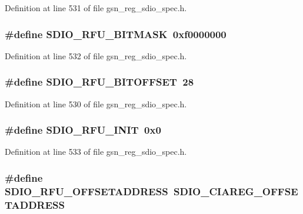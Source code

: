 Definition at line 531 of file gsn\_\-reg\_\-sdio\_\-spec.h.

\hypertarget{a00571_a17c1c637ac34d8ffe8e89a9831f4b377}{
\subsubsection[{SDIO\_\-RFU\_\-BITMASK}]{\setlength{\rightskip}{0pt plus 5cm}\#define SDIO\_\-RFU\_\-BITMASK~0xf0000000}}
\label{a00571_a17c1c637ac34d8ffe8e89a9831f4b377}


Definition at line 532 of file gsn\_\-reg\_\-sdio\_\-spec.h.

\hypertarget{a00571_a8960529b26218fc984c308bf945f24ca}{
\subsubsection[{SDIO\_\-RFU\_\-BITOFFSET}]{\setlength{\rightskip}{0pt plus 5cm}\#define SDIO\_\-RFU\_\-BITOFFSET~28}}
\label{a00571_a8960529b26218fc984c308bf945f24ca}


Definition at line 530 of file gsn\_\-reg\_\-sdio\_\-spec.h.

\hypertarget{a00571_a8f99a3425accb1c048f183b884c95223}{
\subsubsection[{SDIO\_\-RFU\_\-INIT}]{\setlength{\rightskip}{0pt plus 5cm}\#define SDIO\_\-RFU\_\-INIT~0x0}}
\label{a00571_a8f99a3425accb1c048f183b884c95223}


Definition at line 533 of file gsn\_\-reg\_\-sdio\_\-spec.h.

\hypertarget{a00571_ab00e7cb4c2222efa298980139ba77a2e}{
\subsubsection[{SDIO\_\-RFU\_\-OFFSETADDRESS}]{\setlength{\rightskip}{0pt plus 5cm}\#define SDIO\_\-RFU\_\-OFFSETADDRESS~SDIO\_\-CIAREG\_\-OFFSETADDRESS}}
\label{a00571_ab00e7cb4c2222efa298980139ba77a2e}


